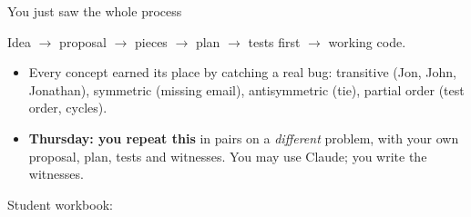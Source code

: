 \begin{frame}{You just saw the whole process}
\begin{center}\Large Idea $\to$ proposal $\to$ pieces $\to$ plan $\to$ tests first $\to$ working code.\end{center}
\vspace{6pt}
\begin{itemize}
\item Every concept earned its place by catching a real bug: transitive (Jon, John, Jonathan), symmetric (missing email), antisymmetric (tie), partial order (test order, cycles).
\item \textbf{Thursday: you repeat this} in pairs on a \emph{different} problem, with your own proposal, plan, tests and witnesses. You may use Claude; you write the witnesses.
\end{itemize}
\vspace{2pt}
{\small Student workbook: }
\end{frame}
